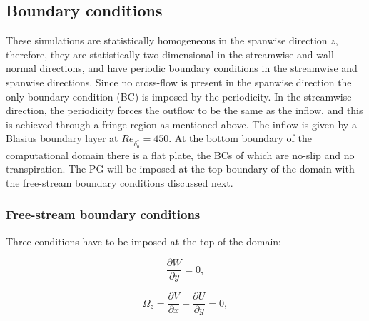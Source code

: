 

\subsection{Boundary conditions} \label{subsec:BC}

These simulations are statistically homogeneous in the spanwise direction $z$, therefore, they are statistically two-dimensional in the streamwise and wall-normal directions, and have periodic boundary conditions in the streamwise and spanwise directions. 
Since no cross-flow is present in the spanwise direction the only boundary condition (BC) is imposed by the periodicity. In the streamwise direction, the periodicity forces the outflow to be the same as the inflow, and this is achieved through a fringe region as mentioned above. 
The inflow is given by a Blasius boundary layer at $Re_{\delta^*_0}=450$.
At the bottom boundary of the computational domain there is a flat plate, the BCs of which are no-slip and no transpiration. 
The PG will be imposed at the top boundary of the domain with the free-stream boundary conditions discussed next.

\subsubsection{Free-stream boundary conditions}
Three conditions have to be imposed at the top of the domain:

\begin{equation} 
    \frac{\partial W}{\partial y}=0,
\label{eq:BC_dWdy}
\end{equation}

\begin{equation} 
    \Omega_z = \frac{\partial V}{\partial x} - \frac{\partial U}{\partial y}=0,
\label{eq:BC_Vort_z}
\end{equation}

